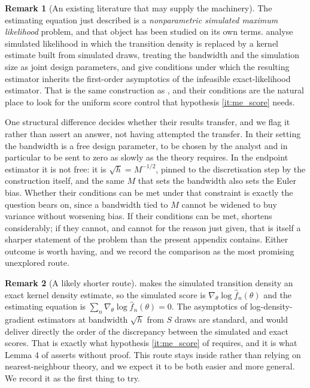 \documentclass[11pt]{article}
\theoremstyle{definition}
\newtheorem{remark}[remark]{Remark}
\begin{document}
\begin{remark}[An existing literature that may supply the machinery]\label{rem:kristensen_shin}
The estimating equation just described is a \emph{nonparametric simulated maximum likelihood} problem, and that object has been studied on its own terms. \citet{KristensenShin2012} analyse simulated likelihood in which the transition density is replaced by a kernel estimate built from simulated draws, treating the bandwidth and the simulation size as joint design parameters, and give conditions under which the resulting estimator inherits the first-order asymptotics of the infeasible exact-likelihood estimator. That is the same construction as , and their conditions are the natural place to look for the uniform score control that hypothesis \ref{it:me_score} needs.

One structural difference decides whether their results transfer, and we flag it rather than assert an answer, not having attempted the transfer. In their setting the bandwidth is a free design parameter, to be chosen by the analyst and in particular to be sent to zero as slowly as the theory requires. In the endpoint estimator it is not free: it is $\sqrt h=M^{-1/2}$, pinned to the discretisation step by the construction itself, and the same $M$ that sets the bandwidth also sets the Euler bias. Whether their conditions can be met under that constraint is exactly the question  bears on, since a bandwidth tied to $M$ cannot be widened to buy variance without worsening bias. If their conditions can be met,  shortens considerably; if they cannot, and cannot for the reason just given, that is itself a sharper statement of the problem than the present appendix contains. Either outcome is worth having, and we record the comparison as the most promising unexplored route.
\end{remark}

\begin{remark}[A likely shorter route]\label{rem:score_route}
 makes the simulated transition density an exact kernel density estimate, so the simulated score is $\nabla_\theta\log\widehat f_n(\theta)$ and the estimating equation is $\sum_n\nabla_\theta\log\widehat f_n(\theta)=0$. The asymptotics of log-density-gradient estimators at bandwidth $\sqrt h$ from $S$ draws are standard, and would deliver directly the order of the discrepancy between the simulated and exact scores. That is exactly what hypothesis \ref{it:me_score} of  requires, and it is what Lemma 4 of \citet{BrandtSantaClara2002} asserts without proof. This route stays inside  rather than relying on nearest-neighbour theory, and we expect it to be both easier and more general. We record it as the first thing to try.
\end{remark}
\end{document}
